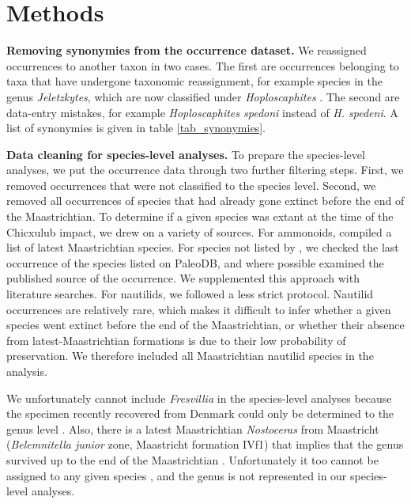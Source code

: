 \documentclass[a4paper]{article}
\begin{document}
\section*{Methods}

\textbf{Removing synonymies from the occurrence dataset.} We reassigned occurrences to another taxon in two cases. The first are occurrences belonging to taxa that have undergone taxonomic reassignment, for example species in the genus \textit{Jeletzkytes}, which are now classified under \textit{Hoploscaphites} \parencite{landmanScaphitesNodosusGroup2010}. The second are data-entry mistakes, for example \textit{Hoploscaphites spedoni} instead of \textit{H. spedeni}. A list of synonymies is given in table \ref{tab_synonymies}. 

\textbf{Data cleaning for species-level analyses.} To prepare the species-level analyses, we put the occurrence data through two further filtering steps. First, we removed occurrences that were not classified to the species level. Second, we removed all occurrences of species that had already gone extinct before the end of the Maastrichtian. To determine if a given species was extant at the time of the Chicxulub impact, we drew on a variety of sources. 
For ammonoids, \textcite{landmanAmmonitesBrinkExtinction2015} compiled a list of latest Maastrichtian species.
For species not listed by \textcite{landmanAmmonitesBrinkExtinction2015}, we checked the last occurrence of the species listed on PaleoDB, and where possible examined the published source of the occurrence. We supplemented this approach with literature searches.
For nautilids, we followed a less strict protocol. Nautilid occurrences are relatively rare, which makes it difficult to infer whether a given species went extinct before the end of the Maastrichtian, or whether their absence from latest-Maastrichtian formations is due to their low probability of preservation. We therefore included all Maastrichtian nautilid species in the analysis. 


We unfortunately cannot include \textit{Fresvillia} in the species-level analyses because the specimen recently recovered from Denmark could only be determined to the genus level \parencite{machalskiAmmoniteSurvivalCretaceous2025}.
Also, there is a latest Maastrichtian \textit{Nostoceras} from Maastricht (\textit{Belemnitella junior} zone, Maastricht formation IVf1) that implies that the genus survived up to the end of the Maastrichtian \parencite{vandertuukEersteVondstVan1979}. Unfortunately it too cannot be assigned to any given species \parencite{vandertuukEersteVondstVan1979}, and the genus is not represented in our species-level analyses. 
\end{document}
